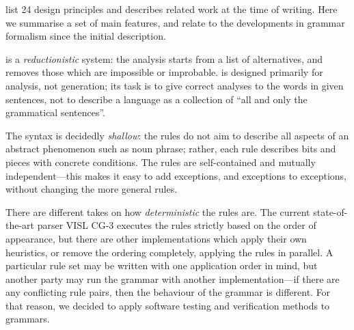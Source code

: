 \citet{karlsson1995constraint} list 24 design principles and describes
related work at the time of writing.
Here we summarise a set of main features, and relate \onlycg{} to the developments in grammar formalism since the initial description.

\onlycg{} is a \emph{reductionistic} system: the analysis starts from a list of alternatives,
and removes those which are impossible or improbable.
\onlycg{} is designed primarily for analysis, not generation; its task is 
to give correct analyses to the words in given sentences,
not to describe a language as a collection of ``all and only the grammatical sentences''.

The syntax is decidedly \emph{shallow}: the rules do not aim to
describe all aspects of an abstract phenomenon such as noun phrase; 
rather, each rule describes bits and pieces with concrete conditions.
The rules are self-contained and mutually independent---this makes it 
easy to add exceptions, and exceptions to exceptions, without 
changing the more general rules.



There are different takes on how \emph{deterministic} the rules are.
The current state-of-the-art \onlycg{} parser VISL CG-3 executes the rules strictly 
based on the order of appearance, but there are other implementations which 
apply their own heuristics, or remove the ordering completely, 
applying the rules in parallel. 
A particular rule set may be written with one application order in mind, but another party may 
run the grammar with another implementation---if there are any conflicting rule pairs, then the behaviour of the grammar is different.
For that reason, we decided to apply software testing and verification methods to \onlycg{} grammars.


